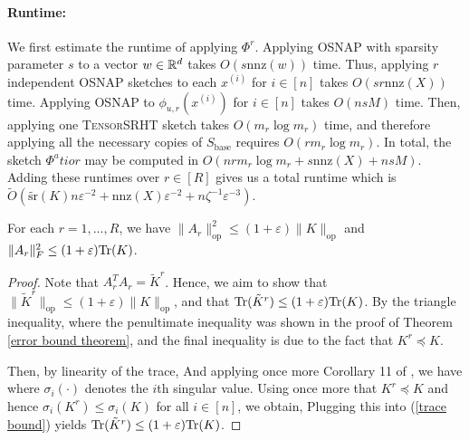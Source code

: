\paragraph{Runtime:} We first estimate the runtime of applying $\Phi^r$. Applying \textsc{OSNAP} with sparsity parameter $s$ to a vector $w\in\mathbb{R}^d$ takes $O(s\text{nnz}(w))$ time. Thus, applying $r$ independent  \textsc{OSNAP}  sketches to each $x^{(i)}$ for $i\in[n]$ takes $O(sr\text{nnz}(X))$ time. Applying \textsc{OSNAP} to $\phi_{u,r}(x^{(i)})$ for $i\in[n]$ takes $O(nsM)$ time.  
Then, applying one \textsc{TensorSRHT} sketch takes $O(m_r\log m_r)$ time, and therefore applying all the necessary copies of $S_\text{base}$ requires $O(r m_r\log m_r)$. In total, the sketch $\Phi^atior$ may be computed in $O(n r m_r\log m_r + s\text{nnz}(X) + nsM)$. Adding these runtimes over $r\in [R]$ gives us a total runtime which is $\tilde O(\tilde{\text{sr}}(K)n\varepsilon^{-2}+\text{nnz}(X)\varepsilon^{-2}+n\zeta^{-1}\varepsilon^{-3})$.\\

\begin{lemma}\label{A norm bounds}
For each $r=1,\dots, R$, we have $\|A_r\|_\text{op}^2\leq (1+\varepsilon)\|K\|_\text{op}$ and $\|A_r\|_F^2 \leq (1+\varepsilon)\textnormal{Tr}(K)$.
\end{lemma}

\begin{proof}
Note that $A_r^T A_r = \tilde K^r$. Hence, we aim to show that $\|\tilde K^r\|_\text{op}\leq (1+\varepsilon)\|K\|_\text{op}$, and that $\textnormal{Tr}(\tilde K^r) \leq(1+\varepsilon)\textnormal{Tr}(K)$. By the triangle inequality, 
where the penultimate inequality was shown in the proof of Theorem \ref{error bound theorem}, and the final inequality is due to the fact that $K^r\preceq K$. 

Then, by linearity of the trace,
And applying once more Corollary 11 of \cite{ando1987singular}, we have
where $\sigma_i(\cdot)$ denotes the $i$th singular value. Using once more that $K^r\preceq K$ and hence $\sigma_i(K^r)\leq \sigma_i(K)$ for all $i\in[n]$, we obtain,
Plugging this into (\ref{trace bound}) yields $\textnormal{Tr}(\tilde K^r) \leq(1+\varepsilon)\textnormal{Tr}(K)$.
\end{proof}


